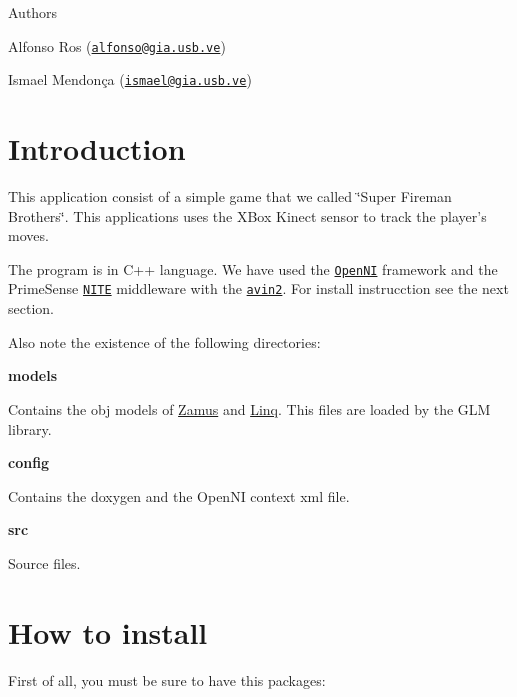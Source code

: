 \begin{DoxyAuthor}{Authors}

\begin{DoxyItemize}
\item Alfonso Ros (\href{mailto:alfonso@gia.usb.ve}{\tt alfonso@gia.usb.ve})
\item Ismael Mendonça (\href{mailto:ismael@gia.usb.ve}{\tt ismael@gia.usb.ve})
\end{DoxyItemize}
\end{DoxyAuthor}
\hypertarget{index_intro}{}\section{Introduction}\label{index_intro}
This application consist of a simple game that we called \char`\"{}Super Fireman
 Brothers\char`\"{}. This applications uses the XBox Kinect sensor to track the player's moves.

The program is in C++ language. We have used the \href{http://www.openni.org/}{\tt OpenNI} framework and the PrimeSense \href{http://www.primesense.com/?p=515}{\tt NITE} middleware with the \href{https://github.com/avin2/SensorKinect}{\tt avin2}. For install instrucction see the next section.

Also note the existence of the following directories:
\begin{DoxyItemize}
\item {\bfseries models}
\begin{DoxyItemize}
\item Contains the obj models of \hyperlink{classZamus}{Zamus} and \hyperlink{classLinq}{Linq}. This files are loaded by the GLM library.
\end{DoxyItemize}
\item {\bfseries config}
\begin{DoxyItemize}
\item Contains the doxygen and the OpenNI context xml file.
\end{DoxyItemize}
\item {\bfseries src}
\begin{DoxyItemize}
\item Source files.
\end{DoxyItemize}
\end{DoxyItemize}



 \hypertarget{index_installation}{}\section{How to install}\label{index_installation}
First of all, you must be sure to have this packages:


